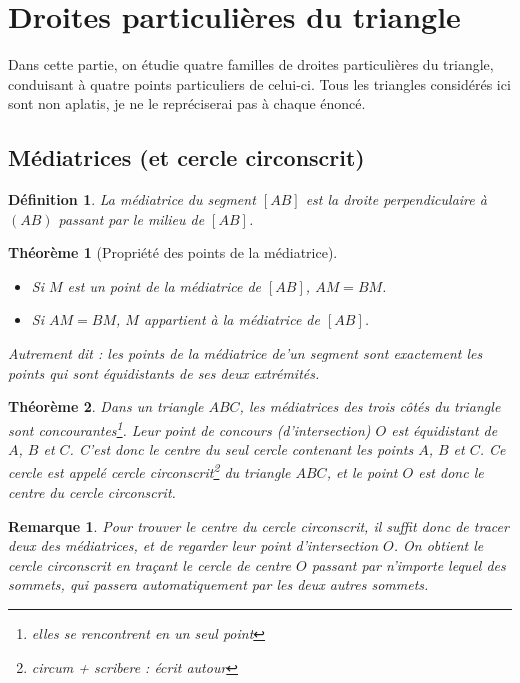 \documentclass[12 pt]{article}
\theoremstyle{plain}
\newcounter{n}
\numberwithin{n}{section}
\newtheorem{theo}{Théorème}
\newtheorem{df}[n]{Définition}
\newtheorem{rmq}[n]{Remarque}
\begin{document}
\section{Droites particulières du triangle}
Dans cette partie, on étudie quatre familles de droites particulières du triangle, 
conduisant à quatre points particuliers de celui-ci. Tous les triangles considérés ici sont non aplatis, je ne le repréciserai pas à chaque énoncé. 
\subsection{Médiatrices (et cercle circonscrit)}

\begin{df}
La \emph{médiatrice} du segment $[AB]$ est la droite perpendiculaire à $(AB)$ passant par le milieu de $[AB]$.
\end{df}

\begin{theo}[Propriété des points de la médiatrice]\begin{itemize}
\item Si $M$ est un point de la médiatrice de $[AB]$, $AM = BM$. 
\item Si $AM=BM$, $M$ appartient à la médiatrice de $[AB]$.
\end{itemize}Autrement dit : \emph{les points de la médiatrice de'un segment sont exactement les points qui sont 
équidistants de ses deux extrémités}. 
\end{theo}

\begin{theo}
Dans un triangle $ABC$, les médiatrices des trois côtés du triangle sont concourantes\footnote{elles se rencontrent en un seul point}. 
Leur point de concours (d'intersection) $O$ est équidistant de $A$, $B$ et $C$. 
C'est donc le centre du seul cercle contenant les points $A$, $B$
et $C$. Ce cercle est appelé \emph{cercle circonscrit}\footnote{circum + scribere : écrit autour} du triangle $ABC$, et le point $O$ est donc 
\emph{le centre du cercle circonscrit}. 
\end{theo}

\begin{rmq}
Pour trouver le centre du cercle circonscrit, il suffit donc de tracer deux des médiatrices, et de regarder leur 
point d'intersection $O$. On obtient le cercle circonscrit en traçant le cercle de centre $O$ passant par n'importe lequel 
des sommets, qui passera automatiquement par les deux autres sommets. 
\end{rmq}
\end{document}

